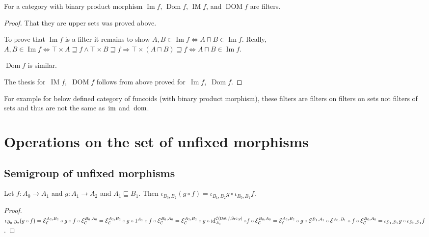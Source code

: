 \begin{prop}
For a category with binary product morphism
$\operatorname{Im}f$, $\operatorname{Dom}f$,
$\operatorname{IM}f$, and $\operatorname{DOM}f$
are filters.
\end{prop}

\begin{proof}
That they are upper sets was proved above.

To prove that $\operatorname{Im} f$ is a filter it remains
to show $A, B \in \operatorname{Im} f \Leftrightarrow
A \sqcap B \in \operatorname{Im} f$. Really,
$A, B \in \operatorname{Im} f \Leftrightarrow \top \times A \sqsupseteq f \land \top
\times B \sqsupseteq f \Rightarrow \top \times (A \sqcap B) \sqsupseteq f
\Leftrightarrow A \sqcap B \in \operatorname{Im} f$.

$\operatorname{Dom} f$ is similar.

The thesis for~$\operatorname{IM}f$,~$\operatorname{DOM}f$
follows from above proved
for~$\operatorname{Im}f$,~$\operatorname{Dom}f$.
\end{proof}

\begin{note}
For example for below defined category of funcoids
(with binary product morphism), these filters are filters
on filters on sets not filters of sets and thus are not
the same as~$\operatorname{im}$ and~$\operatorname{dom}$.
\end{note}

\section{Operations on the set of unfixed morphisms}

\subsection{Semigroup of unfixed morphisms}

\begin{prop}\label{iota-comp}
  Let $f : A_0 \rightarrow A_1$ and $g : A_1 \rightarrow A_2$ and $A_1
  \sqsubseteq B_1$. Then $\iota_{B_0, B_2} (g \circ f) = \iota_{B_1, B_2} g
  \circ \iota_{B_0, B_1} f$.
\end{prop}

\begin{proof}
  $\iota_{B_0, B_2} (g \circ f) = \mathcal{E}_{\mathcal{C}}^{A_2,B_2}
  \circ g \circ f \circ \mathcal{E}_{\mathcal{C}}^{B_0,A_0} = \mathcal{E}_{\mathcal{C}}^{A_2,B_2} \circ g \circ 1^{A_1} \circ f
  \circ \mathcal{E}_{\mathcal{C}}^{B_0,A_0} = \mathcal{E}_{\mathcal{C}}^{A_2,B_2} \circ g \circ \operatorname{id}^{\mathcal{C}(\operatorname{Dst} f,\operatorname{Src} g)}_{A_1} \circ f
  \circ \mathcal{E}_{\mathcal{C}}^{B_0,A_0} = \mathcal{E}_{\mathcal{C}}^{A_2,B_2} \circ g \circ \mathcal{E}^{B_1,A_1}
  \circ \mathcal{E}^{A_1,B_1} \circ f \circ \mathcal{E}_{\mathcal{C}}^{B_0,A_0} = \iota_{B_1, B_2} g \circ \iota_{B_0,
  B_1} f$.
\end{proof}

